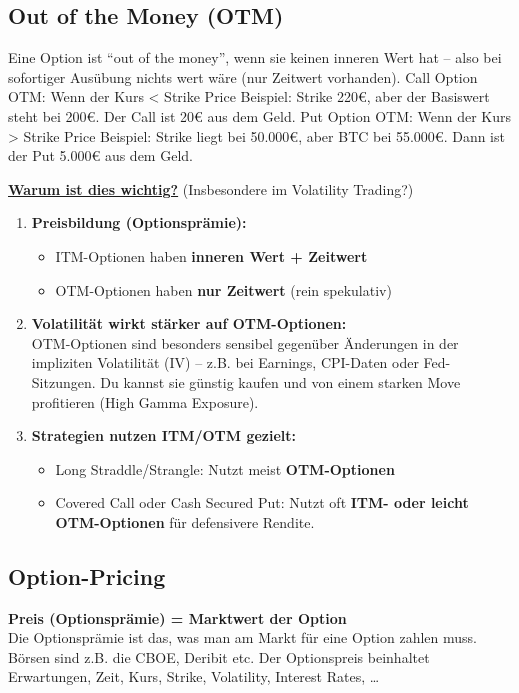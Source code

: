 \subsection{Out of the Money (OTM)}
Eine Option ist “out of the money”, wenn sie keinen inneren Wert hat – also bei sofortiger Ausübung nichts wert wäre (nur Zeitwert vorhanden).
Call Option OTM: Wenn der Kurs < Strike Price
Beispiel: Strike 220€, aber der Basiswert steht bei 200€. Der Call ist 20€ aus dem Geld.
Put Option OTM: Wenn der Kurs > Strike Price
Beispiel: Strike liegt bei 50.000€, aber BTC bei 55.000€. Dann ist der Put 5.000€ aus dem Geld.

\textbf{\underline{Warum ist dies wichtig?}} (Insbesondere im Volatility Trading?)
\begin{enumerate}
  \item \textbf{Preisbildung (Optionsprämie):}
  \begin{itemize}
    \item ITM-Optionen haben \textbf{inneren Wert + Zeitwert}
    \item OTM-Optionen haben \textbf{nur Zeitwert} (rein spekulativ)
  \end{itemize}
  \item \textbf{Volatilität wirkt stärker auf OTM-Optionen:} \\
  OTM-Optionen sind besonders sensibel gegenüber Änderungen in der impliziten Volatilität (IV) – z.B. bei Earnings, CPI-Daten oder Fed-Sitzungen. Du kannst sie günstig kaufen und von einem starken Move profitieren (High Gamma Exposure).
  \item \textbf{Strategien nutzen ITM/OTM gezielt:}
  \begin{itemize}
    \item Long Straddle/Strangle: Nutzt meist \textbf{OTM-Optionen}
    \item Covered Call oder Cash Secured Put: Nutzt oft \textbf{ITM- oder leicht OTM-Optionen} für defensivere Rendite.
  \end{itemize}
\end{enumerate}

\subsection{Option-Pricing}
\textbf{Preis (Optionsprämie) = Marktwert der Option} \\
Die Optionsprämie ist das, was man am Markt für eine Option zahlen muss. Börsen sind z.B. die CBOE, Deribit etc. Der Optionspreis beinhaltet Erwartungen, Zeit, Kurs, Strike, Volatility, Interest Rates, \dots


